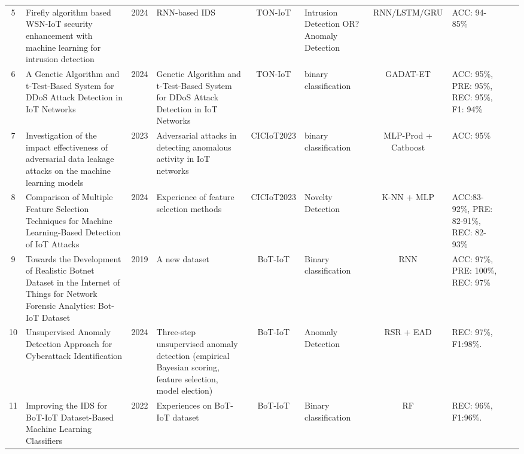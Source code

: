 \documentclass[final,twocolumn,10pt]{elsarticle}
\begin{document}
\begin{table}[!H]
\begin{adjustbox}{width=1\textwidth,center}
\begin{tabular}{@{}c>{\centering\arraybackslash}m{3.5cm}c>{\arraybackslash}m{4.8cm}c>{\centering\arraybackslash}m{2.8cm}c>{\centering\arraybackslash}m{2.5cm}c>{\centering\arraybackslash}m{3.2cm}@{}}
5 & Firefly algorithm based WSN-IoT security enhancement with machine learning for intrusion detection\cite{karthikeyan2024firefly} & 2024 & RNN-based IDS & TON-IoT  & Intrusion Detection OR?  Anomaly Detection  & RNN/LSTM/GRU & ACC: 94-85\% \\ 

6 &A Genetic Algorithm and t-Test-Based System for DDoS Attack Detection in IoT Networks\cite{saiyed2024genetic} & 2024 & Genetic Algorithm and t-Test-Based System for DDoS Attack Detection in IoT Networks &TON-IoT &  binary classification & GADAT-ET  & ACC: 95\%, PRE: 95\%, REC: 95\%, F1: 94\% \\

7 &Investigation of the impact effectiveness of adversarial data leakage attacks on the machine
learning models\cite{parfenov2024investigation}  & 2023 & Adversarial attacks in detecting anomalous activity in IoT networks  & CICIoT2023  & binary classification & MLP-Prod + Catboost & ACC: 95\% \\

8 & Comparison of Multiple Feature Selection Techniques for Machine Learning-Based Detection of IoT Attacks\cite{phan2024comparison} & 2024 & Experience of feature selection methods & CICIoT2023 & Novelty Detection & K-NN + MLP & ACC:83-92\%, PRE: 82-91\%, REC: 82-93\%\\

9 & Towards the Development of Realistic Botnet Dataset in the Internet of Things for Network Forensic Analytics: Bot-IoT Dataset\cite{koroniotis2019towards} & 2019 &   A new dataset & BoT-IoT & Binary classification & RNN & ACC: 97\%, PRE: 100\%, REC: 97\% \\

10 & Unsupervised Anomaly Detection Approach for Cyberattack Identification\cite{segurola2024unsupervised} & 2024 & Three-step unsupervised anomaly detection (empirical Bayesian scoring, feature selection, model election) & BoT-IoT & Anomaly Detection & RSR + EAD  & REC: 97\%, F1:98\%.  \\ 

11 & Improving the IDS for BoT-IoT Dataset-Based Machine Learning Classifiers \cite{9993869} & 2022 & Experiences on BoT-IoT dataset & BoT-IoT & Binary classification  & RF  & REC: 96\%, F1:96\%.  \\ 

\bottomrule
\end{tabular}
\end{adjustbox}
\end{table}
\end{document}
